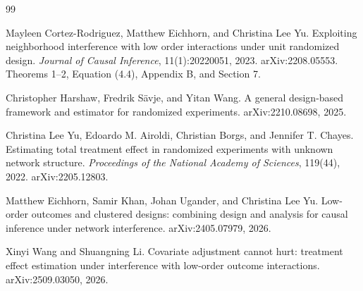 \documentclass{article}
\begin{document}
\begin{thebibliography}{99}

   Mayleen Cortez-Rodriguez, Matthew Eichhorn, and Christina Lee Yu. Exploiting neighborhood interference with low order interactions under unit randomized design. \emph{Journal of Causal Inference}, 11(1):20220051, 2023. arXiv:2208.05553. Theorems 1--2, Equation (4.4), Appendix B, and Section 7.

   Christopher Harshaw, Fredrik Sävje, and Yitan Wang. A general design-based framework and estimator for randomized experiments. arXiv:2210.08698, 2025.

   Christina Lee Yu, Edoardo M. Airoldi, Christian Borgs, and Jennifer T. Chayes. Estimating total treatment effect in randomized experiments with unknown network structure. \emph{Proceedings of the National Academy of Sciences}, 119(44), 2022. arXiv:2205.12803.

   Matthew Eichhorn, Samir Khan, Johan Ugander, and Christina Lee Yu. Low-order outcomes and clustered designs: combining design and analysis for causal inference under network interference. arXiv:2405.07979, 2026.

   Xinyi Wang and Shuangning Li. Covariate adjustment cannot hurt: treatment effect estimation under interference with low-order outcome interactions. arXiv:2509.03050, 2026.

\end{thebibliography}
\end{document}
